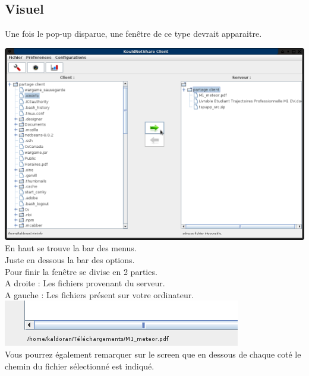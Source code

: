 \documentclass[12pt,a4paper]{article}
\begin{document}
\subsection{Visuel}
Une fois le pop-up disparue, une fenêtre de ce type devrait apparaitre.

\begin{center}
	\includegraphics[scale=0.4]{images/envoi.png} \\
	En haut se trouve la bar des menus. \\
	Juste en dessous la bar des options. \\
	
	Pour finir la fenêtre se divise en 2 parties. \\
	A droite : Les fichiers provenant du serveur. \\
	A gauche : Les fichiers présent sur votre ordinateur. \\
	
	\includegraphics[scale=0.4]{images/chemin.png} \\
	Vous pourrez également remarquer sur le screen que en dessous de chaque coté le chemin du fichier sélectionné est indiqué.

\end{center}
\end{document}
